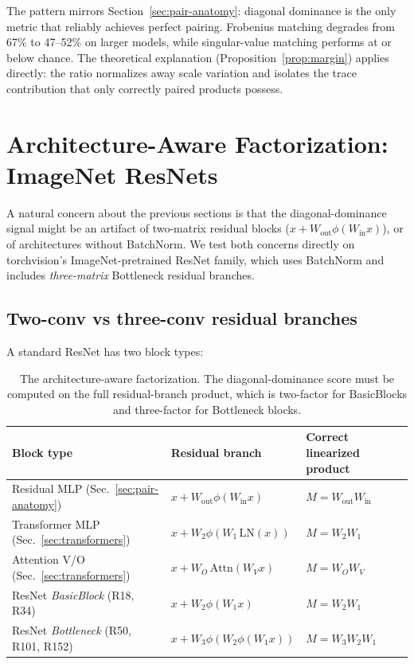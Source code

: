 \documentclass[10pt]{article}
\theoremstyle{remark}
\begin{document}
The pattern mirrors Section~\ref{sec:pair-anatomy}: diagonal dominance
is the only metric that reliably achieves perfect pairing. Frobenius
matching degrades from 67\% to 47--52\% on larger models, while
singular-value matching performs at or below chance. The theoretical
explanation (Proposition~\ref{prop:margin}) applies directly: the ratio
normalizes away scale variation and isolates the trace contribution
that only correctly paired products possess.

\section{Architecture-Aware Factorization: ImageNet ResNets}\label{sec:resnet-imagenet}

A natural concern about the previous sections is that the diagonal-dominance
signal might be an artifact of two-matrix residual blocks
($x + W_{\mathrm{out}} \phi(W_{\mathrm{in}} x)$), or of architectures
without BatchNorm. We test both concerns directly on torchvision's
ImageNet-pretrained ResNet family, which uses BatchNorm and includes
\emph{three-matrix} Bottleneck residual branches.

\subsection{Two-conv vs three-conv residual branches}

A standard ResNet has two block types:

\begin{table}[H]
\centering
\small
\begin{tabular}{lll}
\toprule
Block type & Residual branch & Correct linearized product \\
\midrule
Residual MLP (Sec.~\ref{sec:pair-anatomy}) & $x + W_{\mathrm{out}}\phi(W_{\mathrm{in}} x)$ & $M = W_{\mathrm{out}} W_{\mathrm{in}}$ \\
Transformer MLP (Sec.~\ref{sec:transformers}) & $x + W_2 \phi(W_1\, \mathrm{LN}(x))$ & $M = W_2 W_1$ \\
Attention V/O (Sec.~\ref{sec:transformers}) & $x + W_O\,\mathrm{Attn}(W_V x)$ & $M = W_O W_V$ \\
ResNet \emph{BasicBlock} (R18, R34) & $x + W_2 \phi(W_1 x)$ & $M = W_2 W_1$ \\
ResNet \emph{Bottleneck} (R50, R101, R152) & $x + W_3\phi(W_2\phi(W_1 x))$ & $M = W_3 W_2 W_1$ \\
\bottomrule
\end{tabular}
\caption{The architecture-aware factorization. The diagonal-dominance score
must be computed on the full residual-branch product, which is two-factor
for BasicBlocks and three-factor for Bottleneck blocks.}
\label{tab:factorization}
\end{table}
\end{document}
